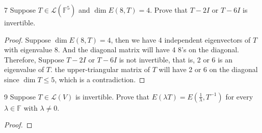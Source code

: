 \documentclass{article}
\newenvironment{problem}[1]{\begin{prob*}{#1}{}}{\end{prob*}}
\begin{document}
\begin{problem}{7}
Suppose $T \in \mathcal{L}(\mathbb{F}^5)$ and $\dim E(8,T) = 4$.
Prove that $T - 2I$ or $T - 6I$ is invertible.
\end{problem}
\begin{proof}
	Suppose $\dim E(8,T) = 4$, then we have 4 independent
	eigenvectors of $T$ with eigenvalue 8. And the diagonal matrix will have 4 8's on the diagonal.
	Therefore, Suppose $T - 2I$ or $T - 6I$ is not invertible, that is, 2 or 6 is an eigenvalue of $T$.
	the upper-triangular matrix of $T$ will have 2 or 6 on the diagonal since $\dim T \leq 5$, which is a contradiction.
\end{proof}

\begin{problem}{9}
Suppose $T \in \mathcal{L}(V)$ is invertible. Prove that
$E(\lambda T) = E(\frac{1}{\lambda}, T^{-1})$ for every $\lambda \in \mathbb{F}$
with $\lambda \neq 0$.
\end{problem}
\begin{proof}

\end{proof}

\end{document}
